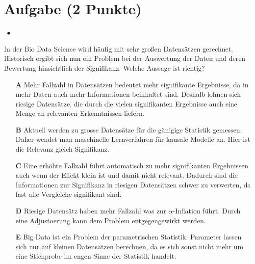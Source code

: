 \documentclass[a4paper, 9pt]{scrartcl}\usepackage[]{graphicx}\usepackage[]{xcolor}
\begin{document}
\section{Aufgabe \hfill (2 Punkte)}

\ifcollection
\begin{flushright}
\tiny\vspace{-2Ex}
\textbf{\examinhaltstart}
\exammodulestatversuch $\;\bullet$
\exammodulebiostat
\vspace{-1Ex}
\end{flushright}
\fi




In der Bio Data Science wird häufig mit sehr großen Datensätzen gerechnet. Historisch ergibt sich nun ein Problem bei der Auswertung der Daten und deren Bewertung hinsichtlich der Signifikanz. Welche Aussage ist richtig?





\begin{enumerate}
\item [\textbf{A} \msquare] Mehr Fallzahl in Datensätzen bedeutet mehr signifikante Ergebnisse, da in mehr Daten auch mehr Informationen beinhaltet sind. Deshalb lohnen sich riesige Datensätze, die durch die vielen signifikanten Ergebnisse auch eine Menge an relevanten Erkenntnissen liefern.
\item [\textbf{B} \msquare] Aktuell werden zu grosse Datensätze für die gänigige Statistik gemessen. Daher wendet man maschinelle Lernverfahren für kausale Modelle an. Hier ist die Relevanz gleich Signifikanz.
\item [\textbf{C} \msquare] Eine erhöhte Fallzahl führt automatisch zu mehr signifikanten Ergebnissen auch wenn der Effekt klein ist und damit nicht relevant. Dadurch sind die Informationen zur Signifikanz in riesigen Datensätzen schwer zu verwerten, da fast alle Vergleiche signifikant sind.
\item [\textbf{D} \msquare] Riesige Datensätz haben mehr Fallzahl was zur $\alpha$-Inflation führt. Durch eine Adjustoerung kann dem Problem entgegengewirkt werden.
\item [\textbf{E} \msquare] Big Data ist ein Problem der parametrischen Statistik. Parameter lassen sich nur auf kleinen Datensätzen berechnen, da es sich sonst nicht mehr um eine Stichprobe im engen Sinne der Statistik handelt.
\end{enumerate}
\end{document}
